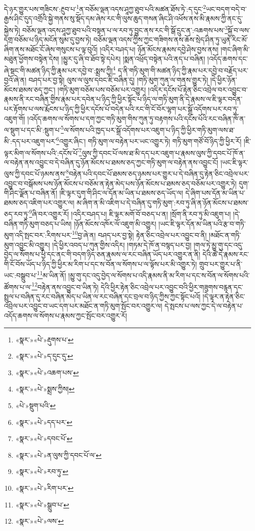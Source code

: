 དེ་ཉར་གྱུར་པས་གཟིངས་:རྔུབ་པ་\footnote{«སྣར་»«པེ་»རྡུགས་པ་}ན་བཅོམ་ལྡན་འདས་ཤཱཀྱ་ཐུབ་པའི་མཚན་ཐོས་ཏེ་:ད་དུང་\footnote{«སྣར་»«པེ་»ད་དུང་དུ་}ཡང་བདག་བདེ་བ་རྒྱས་ཤིང་དུད་འགྲོའི་སྐྱེ་གནས་སུ་སྡོད་དམ་ཞེས་རང་གི་ལུས་ཆུད་གསན་ཞིང་ཤི་འཕོས་ནས་མི་རྣམས་ཀྱི་ནང་དུ་སྐྱེས་ཏེ། བཅོམ་ལྡན་འདས་ཤཱཀྱ་ཐུབ་པའི་བསྟན་པ་ལ་རབ་ཏུ་བྱུང་ནས་རང་གི་སྒོ་དྲུང་ན་:འཆགས་པས་\footnote{«སྣར་»«པེ་»འཆག་པས་}སྐྱོ་བ་ལས་དགྲ་བཅོམ་པ་ཉིད་མངོན་སུམ་དུ་བྱས་ཏེ། བཅོམ་ལྡན་འདས་ཀྱིས་ཀྱང་གཟིགས་ནས་ཆོས་སྲེད་ཤིན་ཏུ་ཡུན་རིང་མོ་ཞིག་ནས་མཐོང་ངོ་ཞེས་གསུངས་པ་ལྟ་བུའོ། །འདིར་བཤད་པ། ཉོན་མོངས་རྣམས་དབྱེ་ཤེས་བྱས་ནས། །གང་ཞིག་མི་མཐུན་ཕྱོགས་བསྟེན་དེས། །མྱུར་དུ་ཞི་བ་ཐོབ་སྟེ་དཔེར། །སྨན་འཕྲོད་བསྟེན་པའི་ནད་པ་བཞིན། །འདོད་ཆགས་དང་ཞེ་སྡང་གི་མཚན་ཉིད་ཀྱི་རྣམ་པར་དབྱེ་བ་:སྨྲས་ཀྱི།\footnote{«སྣར་»«པེ་»སྨྲས་ཀྱིས།} ད་ནི་གཏི་མུག་གི་མཚན་ཉིད་ཀྱི་རྣམ་པར་དབྱེ་བ་བརྗོད་པར་བྱའོ་ཞེ་ན། བཤད་པར་བྱ་སྟེ། ལུས་ལ་ལུས་དབང་ཇི་བཞིན་དུ། །གཏི་མུག་ཀུན་ལ་གནས་གྱུར་ཏེ། །དེ་ཕྱིར་ཉོན་མོངས་ཐམས་ཅད་ཀྱང་། །གཏི་མུག་བཅོམ་པས་བཅོམ་པར་འགྱུར། །འདིར་དངོས་པོ་རྟེན་ཅིང་འབྲེལ་བར་འབྱུང་བ་རྣམས་ནི་རང་བཞིན་གྱིས་རྣམ་པར་དབེན་པ་ཉིད་ཀྱི་ཕྱིར་སྟོང་པ་ཉིད་ལ་གཏི་མུག་ནི་དེ་རྣམས་ལ་ཇི་ལྟར་བདེན་པར་རྟོགས་པ་ལས་རྨོངས་པ་ཉིད་ཀྱི་ཕྱིར་དངོས་པོ་བདེན་པའི་རང་གི་ངོ་བོར་ལྷག་པར་སྒྲོ་འདོགས་པར་རབ་ཏུ་འཇུག་གོ། །འདོད་ཆགས་ལ་སོགས་པ་དག་ཀྱང་གཏི་མུག་གིས་ཀུན་ཏུ་བརྟགས་པའི་དངོས་པོའི་རང་བཞིན་ཁོ་ན་ལ་སྡུག་པ་དང་མི་:སྡུག་པ་\footnote{«པེ་»སྡུག་པའི་}ལ་སོགས་པའི་ཁྱད་པར་སྒྲོ་འདོགས་པར་འཇུག་པ་ཉིད་ཀྱི་ཕྱིར་གཏི་མུག་ལས་ཐ་མི་:དད་པར་འཇུག་པར་\footnote{«སྣར་»«པེ་»དད་པར་}འགྱུར་ཞིང་། གཏི་མུག་ལ་བརྟེན་པར་ཡང་འགྱུར་ཏེ། གཏི་མུག་གཙོ་བོ་ཉིད་ཀྱི་ཕྱིར་རོ། །ཇི་ལྟར་མིག་ལ་སོགས་པའི་:དངོས་པོ་\footnote{«སྣར་»«པེ་»དབང་པོ་}ལུས་ཀྱི་དབང་པོ་ལས་ཐ་མི་དད་པར་འཇུག་པ་རྣམས་ལུས་ཀྱི་དབང་པོ་ཁོ་ན་ལ་བརྟེན་ནས་འབྱུང་བ་དེ་བཞིན་དུ་ཉོན་མོངས་པ་ཐམས་ཅད་ཀྱང་གཏི་མུག་ལ་བརྟེན་ནས་འབྱུང་ངོ། །ཡང་ཇི་ལྟར་ལུས་ཀྱི་དབང་པོ་ཉམས་ནས་\footnote{«སྣར་»«པེ་»ན་ལུས་ཀྱི་དབང་པོ་ལ་}བརྟེན་པའི་དབང་པོ་ཐམས་ཅད་ཉམས་པར་གྱུར་པ་དེ་བཞིན་དུ་རྟེན་ཅིང་འབྲེལ་པར་འབྱུང་བ་བསྒོམས་པས་ཉོན་མོངས་པ་བཅོམ་ན་རྟེན་མེད་པས་ཉོན་མོངས་པ་ཐམས་ཅད་བཅོམ་པར་འགྱུར་ཏེ། དུག་གི་ཤིང་ལྗོན་པ་བཞིན་ནོ། །ཇི་ལྟར་དུག་གི་ཤིང་ལ་དོན་མ་ཡིན་པ་ཐམས་ཅད་ཡོད་ལ། དེ་ཞིག་པས་དོན་མ་ཡིན་པ་ཐམས་ཅད་འཇིག་པར་འགྱུར་ལ། མ་ཞིག་ན་མི་འཇིག་པ་དེ་བཞིན་དུ་གཏི་མུག་:རབ་ཏུ་ཞི་ན་ཉོན་མོངས་པ་ཐམས་ཅད་རབ་ཏུ་\footnote{«སྣར་»«པེ་»རབ་ཏུ་}ཞི་བར་འགྱུར་རོ། །འདིར་བཤད་པ། ཇི་ལྟར་མགོ་བོ་བཅད་པ་ན། །སྲོག་ནི་རབ་ཏུ་མི་འཇུག་པ། །དེ་བཞིན་གཏི་མུག་བཅད་པ་ཡིས། །ཉོན་མོངས་འཁོར་ལོ་འཇུག་མི་འགྱུར། །ཡང་ཇི་ལྟར་དོན་མ་ཡིན་པའི་རྩ་བ་གཏི་མུག་འདི་སྤང་བར་:རིགས་པར་\footnote{«སྣར་»«པེ་»རིག་པར་}བྱ་ཞེ་ན། བཤད་པར་བྱ་སྟེ། རྟེན་ཅིང་འབྲེལ་པར་འབྱུང་བ་ནི། །མཐོང་ན་གཏི་མུག་འབྱུང་མི་འགྱུར། །དེ་ཕྱིར་འབད་པ་ཀུན་གྱིས་འདིར། །གཏམ་དེ་ཁོ་ན་བསྙད་པར་བྱ། །གལ་ཏེ་མྱུ་གུ་དང་འདུ་བྱེད་ལ་སོགས་པ་ཕྱི་དང་ནང་གི་བདག་ཉིད་ཅན་རྣམས་ལ་རང་བཞིན་ཡོད་པར་འགྱུར་ན་ནི། དེའི་ཚེ་དེ་རྣམས་རང་གི་ངོ་བོས་ཡོད་པ་ཉིད་ཀྱི་ཕྱིར་མ་རིག་པ་དང་ས་བོན་ལ་སོགས་པ་ལ་ལྟོས་པར་མི་འགྱུར་ཏེ། གྲུབ་པར་གྱུར་པ་ནི་ཡང་:བསྒྲུབ་པ་\footnote{«སྣར་»«པེ་»སྒྲུབ་པ་}མ་ཡིན་ནོ། །མྱུ་གུ་དང་འདུ་བྱེད་ལ་སོགས་པ་འདི་རྣམས་ནི་མ་རིག་པ་དང་ས་བོན་ལ་སོགས་པའི་ཚོགས་པ་ལ་\footnote{«སྣར་»«པེ་»ལས་}བརྟེན་ནས་འབྱུང་བ་ཡིན་ཏེ། དེའི་ཕྱིར་རྟེན་ཅིང་འབྲེལ་པར་འབྱུང་བའི་ཕྱིར་གཟུགས་བརྙན་དང་སྤྲུལ་པ་བཞིན་དུ་རང་བཞིན་མེད་པ་ཡིན་ལ་རང་བཞིན་དང་བྲལ་བ་ཉིད་ཀྱིས་ཀྱང་སྟོང་པའོ། །དེ་ལྟར་ན་རྟེན་ཅིང་འབྲེལ་པར་འབྱུང་བ་ཡང་དག་པར་མཐོང་ན་གཏི་མུག་སྤོང་བར་འགྱུར་ལ། དེ་སྤངས་པ་ལས་ཀྱང་དེ་ལ་བརྟེན་པ་འདོད་ཆགས་ལ་སོགས་པ་རྣམས་ཀྱང་སྤོང་བར་འགྱུར་རོ། 